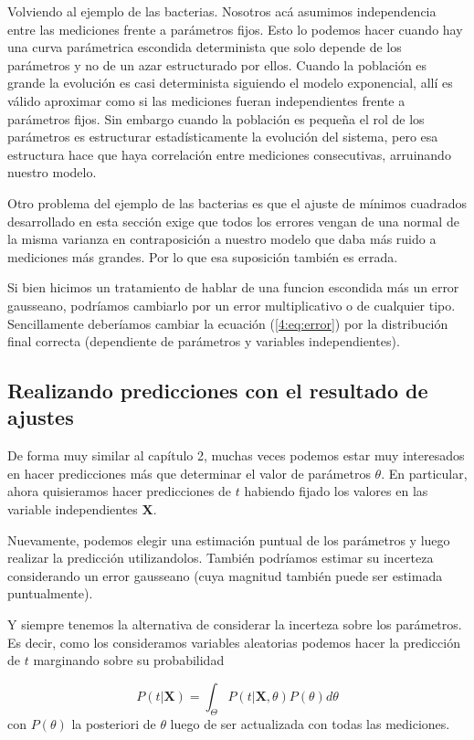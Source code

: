 Volviendo al ejemplo de las bacterias. Nosotros ac\'a asumimos independencia entre las mediciones frente a par\'ametros fijos. Esto lo podemos hacer cuando hay una curva par\'ametrica escondida determinista que solo depende de los par\'ametros y no de un azar estructurado por ellos. Cuando la poblaci\'on es grande la evoluci\'on es casi determinista siguiendo el modelo exponencial, all\'i es v\'alido aproximar como si las mediciones fueran independientes frente a par\'ametros fijos. Sin embargo cuando la poblaci\'on es pequeña el rol de los par\'ametros es estructurar estad\'isticamente la evoluci\'on del sistema, pero esa estructura hace que haya correlaci\'on entre mediciones consecutivas, arruinando nuestro modelo.

Otro problema del ejemplo de las bacterias es que el ajuste de m\'inimos cuadrados desarrollado en esta secci\'on exige que todos los errores vengan de una normal de la misma varianza en contraposici\'on a nuestro modelo que daba m\'as ruido a mediciones m\'as grandes. Por lo que esa suposici\'on tambi\'en es errada.

Si bien hicimos un tratamiento de hablar de una funcion escondida m\'as un error gausseano, podr\'iamos cambiarlo por un error multiplicativo o de cualquier tipo. Sencillamente deber\'iamos cambiar la ecuaci\'on (\ref{4:eq:error}) por la distribuci\'on final correcta (dependiente de par\'ametros y variables independientes).


\subsection{Realizando predicciones con el resultado de ajustes}
De forma muy similar al cap\'itulo 2, muchas veces podemos estar muy interesados en hacer predicciones m\'as que determinar el valor de par\'ametros $\theta$. En particular, ahora quisieramos hacer predicciones de $t$ habiendo fijado los valores en las variable independientes $\mathbf{X}$.

Nuevamente, podemos elegir una estimaci\'on puntual de los par\'ametros y luego realizar la predicci\'on utilizandolos. Tambi\'en podr\'iamos estimar su incerteza considerando un error gausseano (cuya magnitud tambi\'en puede ser estimada puntualmente).

Y siempre tenemos la alternativa de considerar la incerteza sobre los par\'ametros. Es decir, como los consideramos variables aleatorias podemos hacer la predicci\'on de $t$ marginando sobre su probabilidad

\begin{equation}
    P(t|\mathbf{X}) = \int_\Theta P(t|\mathbf{X},\theta)P(\theta) d\theta
\end{equation}
con $P(\theta)$ la posteriori de $\theta$ luego de ser actualizada con todas las mediciones.


